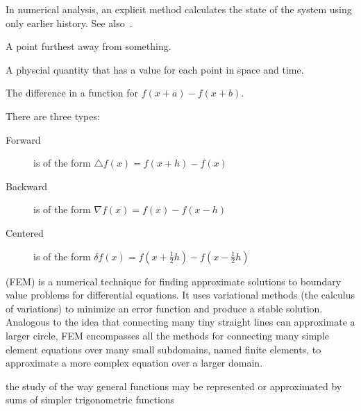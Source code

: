\begin{definition}\label{explicitmethod}
    In numerical analysis, an explicit method calculates the state of the system
    using only earlier history. See also~.
\end{definition}


\begin{definition}
    A point furthest away from something.
\end{definition}

\begin{definition}[Field]
    A physcial quantity that has a value for each point in space and time.
\end{definition}

\begin{definition}
    The difference in a function for $f(x + a) - f(x + b)$.

    There are three types:
    \begin{description}
        \item[Forward] is of the form $\bigtriangleup{f}(x) = f(x + h) - f(x)$
        \item[Backward] is of the form $\nabla{f}(x) = f(x) - f(x - h)$
        \item[Centered] is of the form $\delta{f}(x) = f(x + \frac{1}{2}h) - f(x - \frac{1}{2}h)$
    \end{description}
\end{definition}

\begin{definition}
    (FEM) is a numerical technique for finding approximate solutions to
    boundary value problems for differential equations. It uses variational
    methods (the calculus of variations) to minimize an error function and
    produce a stable solution.  Analogous to the idea that connecting many tiny
    straight lines can approximate a larger circle, FEM encompasses all the
    methods for connecting many simple element equations over many small
    subdomains, named finite elements, to approximate a more complex equation
    over a larger domain.

\end{definition}

\begin{definition}

\end{definition}

\begin{definition}
    the study of the way general functions may be represented or approximated
    by sums of simpler trigonometric functions

\end{definition}

